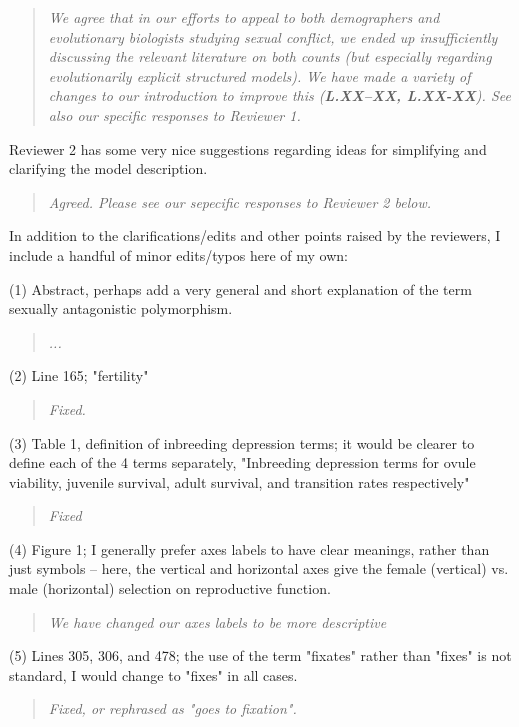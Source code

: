 \documentclass[11pt]{article}
\begin{document}
\begin{quote}
	{\itshape We agree that in our efforts to appeal to both demographers and evolutionary biologists studying sexual conflict, we ended up insufficiently discussing the relevant literature on both counts (but especially regarding evolutionarily explicit structured models). We have made a variety of changes to our introduction to improve this ({\bf L.XX--XX, L.XX-XX}). See also our specific responses to Reviewer 1. }
\end{quote}


Reviewer 2 has some very nice suggestions regarding ideas for simplifying and clarifying the model description.

\begin{quote}
	{\itshape Agreed. Please see our sepecific responses to Reviewer 2 below.}
\end{quote}

In addition to the clarifications/edits and other points raised by the reviewers, I include a handful of minor edits/typos here of my own:
\bigskip

\noindent (1) Abstract, perhaps add a very general and short explanation of the term sexually antagonistic polymorphism.
\begin{quote}
	{\itshape ...}
\end{quote}

\noindent (2) Line 165; "fertility"
\begin{quote}
	{\itshape Fixed.}
\end{quote}

\noindent (3) Table 1, definition of inbreeding depression terms; it would be clearer to define each of the 4 terms separately, "Inbreeding depression terms for ovule viability, juvenile survival, adult survival, and transition rates respectively"
\begin{quote}
	{\itshape Fixed}
\end{quote}

\noindent (4) Figure 1; I generally prefer axes labels to have clear meanings, rather than just symbols – here, the vertical and horizontal axes give the female (vertical) vs. male (horizontal) selection on reproductive function.
\begin{quote}
	{\itshape We have changed our axes labels to be more descriptive }
\end{quote}

\noindent (5) Lines 305, 306, and 478; the use of the term "fixates" rather than "fixes" is not standard, I would change to "fixes" in all cases.
\begin{quote}
	{\itshape Fixed, or rephrased as "goes to fixation".}
\end{quote}
\end{document}
